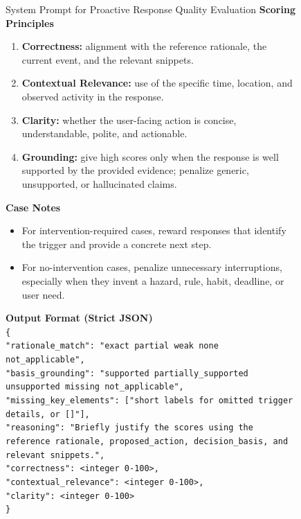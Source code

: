 \begin{figure}[!t]
\begin{promptbox}{System Prompt for Proactive Response Quality Evaluation}
\vspace{0.35em}
\noindent\textbf{Scoring Principles}
\begin{enumerate}
    \item \textbf{Correctness:} alignment with the reference rationale, the current event, and the relevant snippets.
    \item \textbf{Contextual Relevance:} use of the specific time, location, and observed activity in the response.
    \item \textbf{Clarity:} whether the user-facing action is concise, understandable, polite, and actionable.
    \item \textbf{Grounding:} give high scores only when the response is well supported by the provided evidence; penalize generic, unsupported, or hallucinated claims.
\end{enumerate}

\vspace{0.35em}
\noindent\textbf{Case Notes}
\begin{itemize}
    \item For intervention-required cases, reward responses that identify the trigger and provide a concrete next step.
    \item For no-intervention cases, penalize unnecessary interruptions, especially when they invent a hazard, rule, habit, deadline, or user need.
\end{itemize}

\vspace{0.35em}
\noindent\textbf{Output Format (Strict JSON)}
\vspace{0.35em}
\\ \texttt{\hspace*{1.5em}\{}
\\ \texttt{\hspace*{3.0em}"rationale\_match": "exact \textbar{} partial \textbar{} weak \textbar{} none \textbar{} not\_applicable",}
\\ \texttt{\hspace*{3.0em}"basis\_grounding": "supported \textbar{} partially\_supported \textbar{} unsupported \textbar{} missing \textbar{} not\_applicable",}
\\ \texttt{\hspace*{3.0em}"missing\_key\_elements": ["short labels for omitted trigger details, or []"],}
\\ \texttt{\hspace*{3.0em}"reasoning": "Briefly justify the scores using the reference rationale, proposed\_action, decision\_basis, and relevant snippets.",}
\\ \texttt{\hspace*{3.0em}"correctness": <integer 0-100>,}
\\ \texttt{\hspace*{3.0em}"contextual\_relevance": <integer 0-100>,}
\\ \texttt{\hspace*{3.0em}"clarity": <integer 0-100>}
\\ \texttt{\hspace*{1.5em}\}}


\end{promptbox}
\end{figure}
